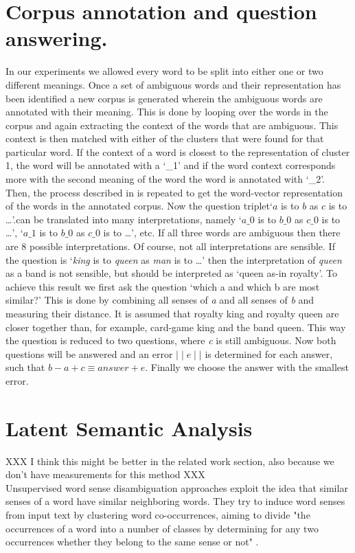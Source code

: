 \documentclass[11pt]{article}
\begin{document}
\section{Corpus annotation and question answering.}
In our experiments we allowed every word to be split into either one or two different meanings.
Once a set of ambiguous words and their representation has been identified a new corpus is generated wherein the ambiguous words are annotated with their meaning. This is done by looping over the words in the corpus and again extracting the context of the words that are ambiguous. This context is then matched with either of the clusters that were found for that particular word. If the context of a word is closest to the representation of cluster 1, the word will be annotated with a `\_1' and if the word context corresponds more with the second meaning of the word the word is annotated with `\_2'. Then, the process described in \cite{Mikolov:13} is repeated to get the word-vector representation of the words in the annotated corpus. Now the question triplet`$a$ is to $b$ as $c$ is to \dots'.can be translated into many interpretations, namely `$a\_0$ is to $b\_0 $ as $c\_0 $ is to \dots', `$a\_1$ is to $b\_0 $ as $c\_0 $ is to \dots', etc. If all three words are ambiguous then there are 8 possible interpretations. Of course, not all interpretations are sensible. If the question is `\textit{king} is to \textit{queen} as \textit{man} is to \dots' then the interpretation of \textit{queen} as a band is not sensible, but should be interpreted as `queen as-in royalty'. To achieve this result we first ask the question `which a and which b are most similar?' This is done by combining all senses of \textit{a} and all senses of \textit{b} and measuring their distance. It is assumed that royalty king and royalty queen are closer together than, for example, card-game king and the band queen. This way the question is reduced to two questions, where \textit{c} is still ambiguous. Now both questions will be answered and an error $\mid\mid \textit{e} \mid\mid$ is determined for each answer, such that $\textit{b} - \textit{a} + \textit{c} \equiv \textit{answer} + \textit{e}$. Finally we choose the answer with the smallest error.

\section{Latent Semantic Analysis}
XXX I think this might be better in the related work section, also because we don't have measurements for this method XXX\\
Unsupervised word sense disambiguation approaches exploit the idea that similar senses of a word have similar neighboring words. They try to induce word senses from input text by clustering word co-occurrences, aiming to divide "the occurrences of a word into a number of classes by determining for any two occurrences whether they belong to the same sense or not" \cite{Schutze:98}.
\end{document}
